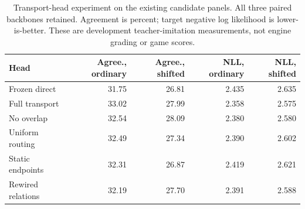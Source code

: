 \begin{table}[t]
\centering\small
\caption{Transport-head experiment on the existing candidate panels. All three paired backbones retained. Agreement is percent; target negative log likelihood is lower-is-better. These are development teacher-imitation measurements, not engine grading or game scores.}
\begin{tabular}{lrrrr}
\toprule
Head & Agree., ordinary & Agree., shifted & NLL, ordinary & NLL, shifted \\
\midrule
Frozen direct & 31.75 & 26.81 & 2.435 & 2.635 \\
Full transport & 33.02 & 27.99 & 2.358 & 2.575 \\
No overlap & 32.54 & 28.09 & 2.380 & 2.580 \\
Uniform routing & 32.49 & 27.34 & 2.390 & 2.602 \\
Static endpoints & 32.31 & 26.87 & 2.419 & 2.621 \\
Rewired relations & 32.19 & 27.70 & 2.391 & 2.588 \\
\bottomrule
\end{tabular}
\end{table}
